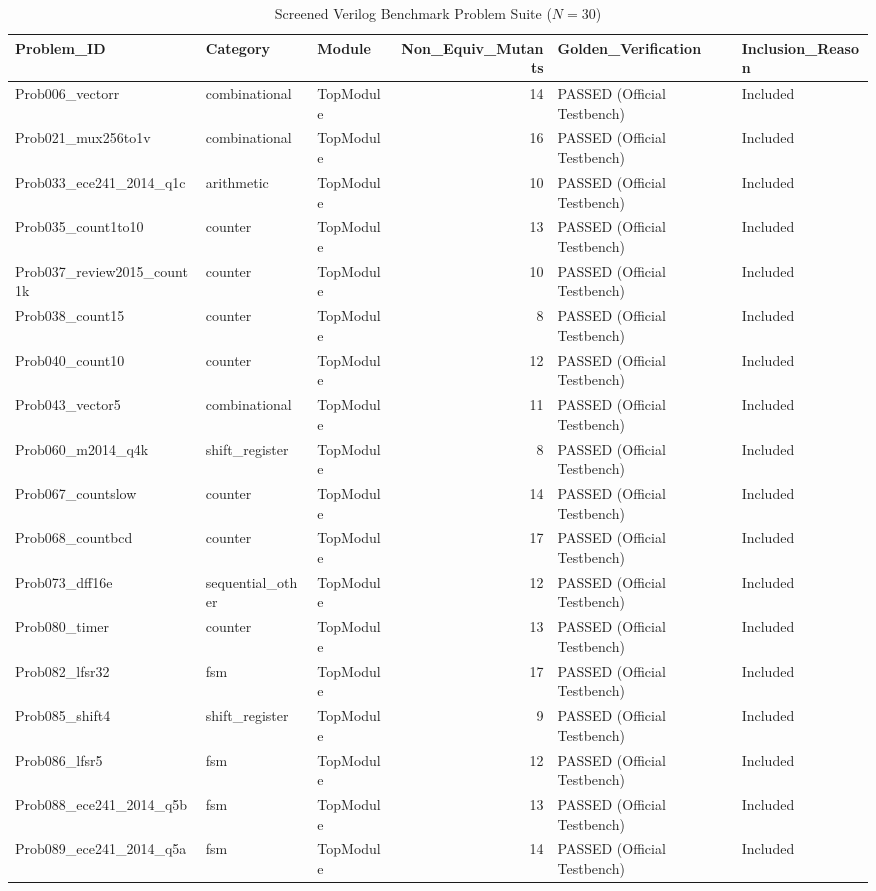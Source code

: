 \begin{table}
\caption{Screened Verilog Benchmark Problem Suite ($N=30$)}
\label{tab:problems}
\begin{tabular}{lllrll}
\toprule
Problem_ID & Category & Module & Non_Equiv_Mutants & Golden_Verification & Inclusion_Reason \\
\midrule
Prob006_vectorr & combinational & TopModule & 14 & PASSED (Official Testbench) & Included \\
Prob021_mux256to1v & combinational & TopModule & 16 & PASSED (Official Testbench) & Included \\
Prob033_ece241_2014_q1c & arithmetic & TopModule & 10 & PASSED (Official Testbench) & Included \\
Prob035_count1to10 & counter & TopModule & 13 & PASSED (Official Testbench) & Included \\
Prob037_review2015_count1k & counter & TopModule & 10 & PASSED (Official Testbench) & Included \\
Prob038_count15 & counter & TopModule & 8 & PASSED (Official Testbench) & Included \\
Prob040_count10 & counter & TopModule & 12 & PASSED (Official Testbench) & Included \\
Prob043_vector5 & combinational & TopModule & 11 & PASSED (Official Testbench) & Included \\
Prob060_m2014_q4k & shift_register & TopModule & 8 & PASSED (Official Testbench) & Included \\
Prob067_countslow & counter & TopModule & 14 & PASSED (Official Testbench) & Included \\
Prob068_countbcd & counter & TopModule & 17 & PASSED (Official Testbench) & Included \\
Prob073_dff16e & sequential_other & TopModule & 12 & PASSED (Official Testbench) & Included \\
Prob080_timer & counter & TopModule & 13 & PASSED (Official Testbench) & Included \\
Prob082_lfsr32 & fsm & TopModule & 17 & PASSED (Official Testbench) & Included \\
Prob085_shift4 & shift_register & TopModule & 9 & PASSED (Official Testbench) & Included \\
Prob086_lfsr5 & fsm & TopModule & 12 & PASSED (Official Testbench) & Included \\
Prob088_ece241_2014_q5b & fsm & TopModule & 13 & PASSED (Official Testbench) & Included \\
Prob089_ece241_2014_q5a & fsm & TopModule & 14 & PASSED (Official Testbench) & Included \\

\end{tabular}
\end{table}
